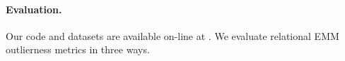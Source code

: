 {%
%
%
%
%
\paragraph{Evaluation.} Our code and datasets are available on-line at \citep{url}. We evaluate relational EMM outlierness metrics in three ways.

}
